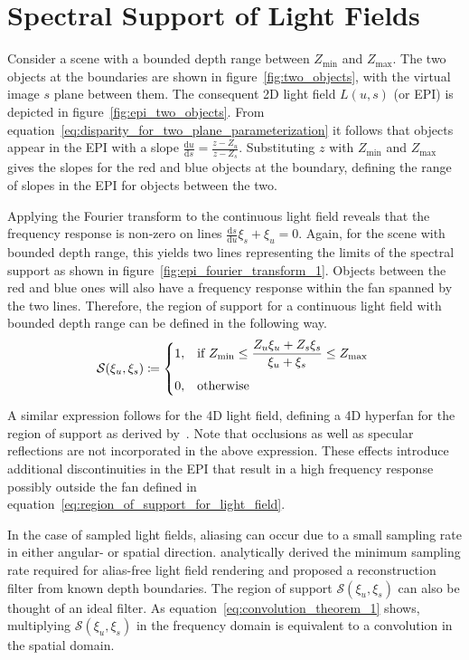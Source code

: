 \section{Spectral Support of Light Fields}
\label{sec:Spectral_Support_for_Light_Field}

Consider a scene with a bounded depth range between $Z_{\text{min}}$ and $Z_{\text{max}}$.
The two objects at the boundaries are shown in figure~\ref{fig:two_objects}, with the virtual image $s$ plane between them.
The consequent 2D light field $L(u, s)$ (or EPI) is depicted in figure~\ref{fig:epi_two_objects}.
From equation~\ref{eq:disparity_for_two_plane_parameterization} it follows that objects appear in the EPI with a slope $\frac{\textrm{d}u}{\textrm{d}s} = \frac{z - Z_u}{z - Z_s}$.
Substituting $z$ with $Z_\text{min}$ and $Z_\text{max}$ gives the slopes for the red and blue objects at the boundary, defining the range of slopes in the EPI for objects between the two.

Applying the Fourier transform to the continuous light field reveals that the frequency response is non-zero on lines $\frac{\textrm{d}s}{\textrm{d}u} \xi_s + \xi_u = 0$. 
Again, for the scene with bounded depth range, this yields two lines representing the limits of the spectral support as shown in figure~\ref{fig:epi_fourier_transform_1}.
Objects between the red and blue ones will also have a frequency response within the fan spanned by the two lines.
Therefore, the region of support for a continuous light field with bounded depth range can be defined in the following way.
\begin{equation}\label{eq:region_of_support_for_light_field}
	\mathcal{S}(\xi_u, \xi_s) \coloneqq 
	    \begin{dcases*}
		    1, 			& if $Z_\text{min} \leq \dfrac{Z_u \xi_u + Z_s \xi_s}{\xi_u + \xi_s} \leq Z_\text{max}$ \\
		    0,			& otherwise $\vphantom{\dfrac{0}{0}}$ 
	    \end{dcases*}
\end{equation}
A similar expression follows for the 4D light field, defining a 4D hyperfan for the region of support as derived by~\cite{LinearVolumetricFocus}.
Note that occlusions as well as specular reflections are not incorporated in the above expression.
These effects introduce additional discontinuities in the EPI that result in a high frequency response possibly outside the fan defined in equation~\ref{eq:region_of_support_for_light_field}.

In the case of sampled light fields, aliasing can occur due to a small sampling rate in either angular- or spatial direction.
\cite{PlenopticSampling} analytically derived the minimum sampling rate required for alias-free light field rendering and proposed a reconstruction filter from known depth boundaries.
The region of support $\mathcal{S}(\xi_u, \xi_s)$ can also be thought of an ideal filter.
As equation~\ref{eq:convolution_theorem_1} shows, multiplying $\mathcal{S}(\xi_u, \xi_s)$ in the frequency domain is equivalent to a convolution in the spatial domain.

